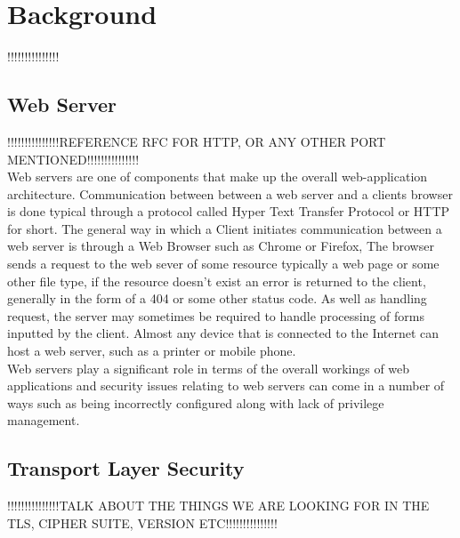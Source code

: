 \documentclass[a4wide,leqno,12pt]{report}
\begin{document}
\chapter{Background}
!!!!!!!!!!!!!!!
\section{Web Server}
!!!!!!!!!!!!!!!REFERENCE RFC FOR HTTP, OR ANY OTHER PORT MENTIONED!!!!!!!!!!!!!!!\\




Web servers are one of components that make up the overall web-application architecture.
Communication between between a web server and a clients browser is done typical through a protocol called Hyper Text Transfer Protocol or HTTP for short. The general way in which a Client initiates communication between a web server is through a Web Browser such as Chrome or Firefox, The browser sends a request to the web sever of some resource typically a web page or some other file type, if the resource doesn't exist an error is returned to the client, generally in the form of a 404 or some other status code. As well as handling request, the server may sometimes be required to handle processing of forms inputted by the client\cite{conallen1999modeling}. Almost any device that is connected to the Internet can host a web server, such as a printer or mobile phone. \\

Web servers play a significant role in terms of the overall workings of web applications and security issues relating to web servers can come in a number of ways such as being incorrectly configured\cite{mendes2008assessing} along with lack of privilege management.
\section{Transport Layer Security}
!!!!!!!!!!!!!!!TALK ABOUT THE THINGS WE ARE LOOKING FOR IN THE TLS, CIPHER SUITE, VERSION ETC!!!!!!!!!!!!!!!\\
\end{document}
